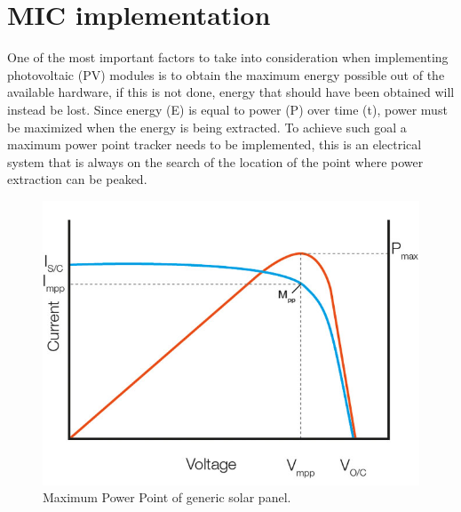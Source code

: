 
\section{MIC implementation}
One of the most important factors to take into consideration when implementing photovoltaic (PV) modules is to obtain the maximum energy possible out of the available hardware, if this is not done, energy that should have been obtained will instead be lost. Since energy (E) is equal to power (P) over time (t), power must be maximized when the energy is being extracted. To achieve such goal a maximum power point tracker needs to be implemented, this is an electrical system that is always on the search of the location of the point where power extraction can be peaked. 
\begin{figure}[htbp]
	\begin{center}
		\includegraphics[width=0.6\linewidth]{../Pictures/mpp_graph.jpg}
		\caption{Maximum Power Point of generic solar panel.}
		\label{fig:mpp}
	\end{center}
\end{figure}


